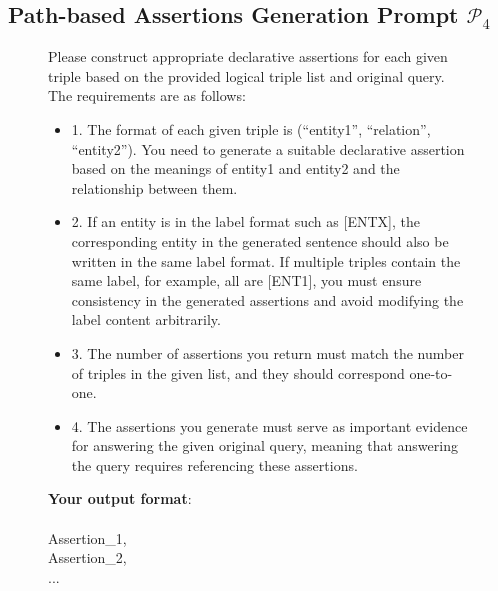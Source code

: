 \documentclass[11pt]{article}
\begin{document}
\subsection{Path-based Assertions Generation Prompt \hyperref[fig:p4]{$ \mathcal{P}_4 $}}

\begin{figure}[H]
    \centering
    \footnotesize
    \begin{tcolorbox}[
        title={Path-based Assertions Generation Prompt ($\mathcal{P}_4$)},      %
        colback=gray!5,                        %
        colframe=gray!60,                  %
        coltitle=white,                       %
        fonttitle=\small\bfseries,            %
        boxrule=0.8pt,                        %
        left=2mm, right=2mm, top=2mm, bottom=2mm, %
        arc=1mm,                              %
        width=\columnwidth                      %
    ]
    
    Please construct appropriate declarative assertions for each given triple based on the provided logical triple list and original query. The requirements are as follows: 
    \begin{itemize}
    \item 1. The format of each given triple is (``entity1'', ``relation'', ``entity2''). You need to generate a suitable declarative assertion based on the meanings of entity1 and entity2 and the relationship between them.
    \item 2. If an entity is in the label format such as [ENTX], the corresponding entity in the generated sentence should also be written in the same label format. If multiple triples contain the same label, for example, all are [ENT1], you must ensure consistency in the generated assertions and avoid modifying the label content arbitrarily.
    \item 3. The number of assertions you return must match the number of triples in the given list, and they should correspond one-to-one.
    \item 4. The assertions you generate must serve as important evidence for answering the given original query, meaning that answering the query requires referencing these assertions.
    \end{itemize}

    \textbf{Your output format}: \\
    \text{[}\\
    \text{      } Assertion\_1, \\
    \text{      } Assertion\_2, \\
    \text{      } ...\\
    \text{]}


\end{tcolorbox}
\end{figure}
\end{document}
